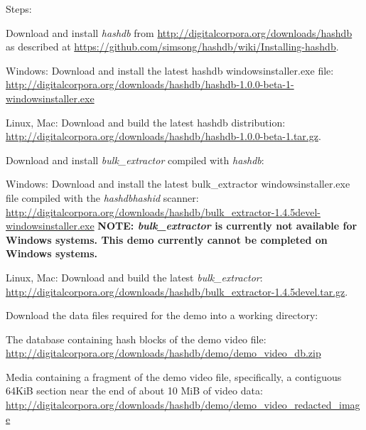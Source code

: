\documentclass[12pt,twoside]{article}
\newcommand{\hdb}{\emph{hashdb}\xspace}
\newcommand{\bulk}{\emph{bulk\_extractor}\xspace}
\newcommand{\hashid}{\emph{hashid}\xspace}
\begin{document}
Steps:
\begin{compactenum}
\item Download and install \hdb from
\url{http://digitalcorpora.org/downloads/hashdb}
as described at
\url{https://github.com/simsong/hashdb/wiki/Installing-hashdb}.
  \begin{compactitem}
  \item Windows: Download and install the latest hashdb windowsinstaller.exe file:
  \url{http://digitalcorpora.org/downloads/hashdb/hashdb-1.0.0-beta-1-windowsinstaller.exe}
  \item Linux, Mac: Download and build the latest hashdb distribution:
  \url{http://digitalcorpora.org/downloads/hashdb/hashdb-1.0.0-beta-1.tar.gz}.
  \end{compactitem}
\item Download and install \bulk compiled with \hdb:
  \begin{compactitem}
  \item Windows: Download and install the latest
  bulk\_extractor windowsinstaller.exe file
  compiled with the \hdb \hashid scanner:
  \url{http://digitalcorpora.org/downloads/hashdb/bulk\_extractor-1.4.5devel-windowsinstaller.exe}
  \textbf{NOTE: \bulk is currently not available for Windows systems.
                This demo currently cannot be completed on Windows systems.}
  \item Linux, Mac: Download and build the latest \bulk:
  \url{http://digitalcorpora.org/downloads/hashdb/bulk\_extractor-1.4.5devel.tar.gz}.
  \end{compactitem}

\item Download the data files required for the demo into a working directory:
  \begin{compactitem}
  \item The database containing hash blocks of the demo video file:
  \url{http://digitalcorpora.org/downloads/hashdb/demo/demo\_video\_db.zip}
  \item Media containing a fragment of the demo video file,
  specifically, a contiguous 64KiB section
  near the end of about 10 MiB of video data:
  \url{http://digitalcorpora.org/downloads/hashdb/demo/demo\_video\_redacted\_image}
  \end{compactitem}


\end{compactenum}
\end{document}
